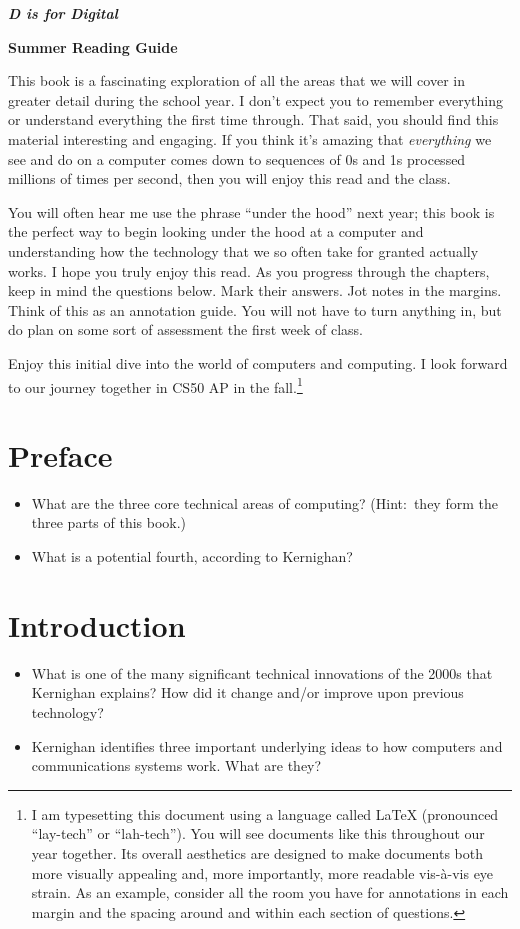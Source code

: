 \documentclass[12pt]{article}
\author{Peter Strawn}
\begin{document}
\begin{center}
\Large{\textbf{\textit{D is for Digital}}}

\large{\textbf{Summer Reading Guide}}
\end{center}

This book is a fascinating exploration of all the areas that we will cover in greater detail during the school year. I don't expect you to remember everything or understand everything the first time through. That said, you should find this material interesting and engaging. If you think it's amazing that \textit{everything} we see and do on a computer comes down to sequences of 0s and 1s processed millions of times per second, then you will enjoy this read and the class.

You will often hear me use the phrase ``under the hood'' next year; this book is the perfect way to begin looking under the hood at a computer and understanding how the technology that we so often take for granted actually works. I hope you truly enjoy this read. As you progress through the chapters, keep in mind the questions below. Mark their answers. Jot notes in the margins. Think of this as an annotation guide. You will not have to turn anything in, but do plan on some sort of assessment the first week of class.

Enjoy this initial dive into the world of computers and computing. I look forward to our journey together in CS50 AP in the fall.\footnote{I am typesetting this document using a language called \LaTeX{} (pronounced ``lay-tech'' or ``lah-tech''). You will see documents like this throughout our year together. Its overall aesthetics are designed to make documents both more visually appealing and, more importantly, more readable vis-\`{a}-vis eye strain. As an example, consider all the room you have for annotations in each margin and the spacing around and within each section of questions.} 

\section*{Preface}
\begin{itemize}
	\item What are the three core technical areas of computing? (Hint:\  they form the three parts of this book.)
	\item What is a potential fourth, according to Kernighan?
\end{itemize}

\section*{Introduction}
\begin{itemize}
	\item What is one of the many significant technical innovations of the 2000s that Kernighan explains? How did it change and/or improve upon previous technology?
	\item Kernighan identifies three important underlying ideas to how computers and communications systems work. What are they?
	
\end{itemize}
\end{document}
